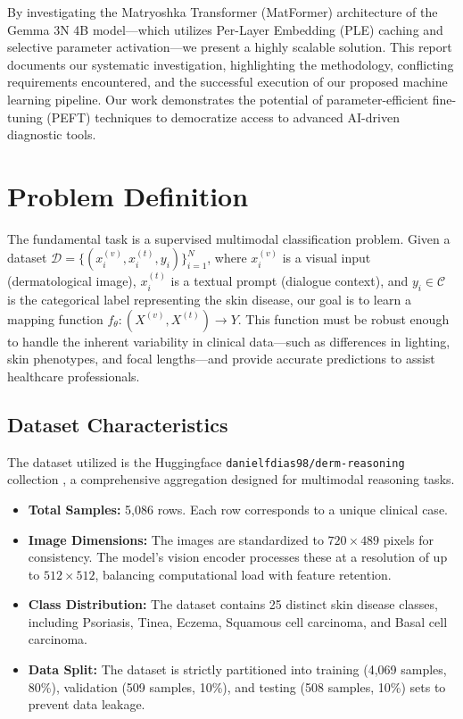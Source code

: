 \documentclass[12pt, a4paper]{article}
\begin{document}
By investigating the Matryoshka Transformer (MatFormer) architecture \cite{kusupati2022matryoshka} of the Gemma 3N 4B model—which utilizes Per-Layer Embedding (PLE) caching and selective parameter activation—we present a highly scalable solution. This report documents our systematic investigation, highlighting the methodology, conflicting requirements encountered, and the successful execution of our proposed machine learning pipeline. Our work demonstrates the potential of parameter-efficient fine-tuning (PEFT) techniques to democratize access to advanced AI-driven diagnostic tools.

\section{Problem Definition}
The fundamental task is a supervised multimodal classification problem. Given a dataset $\mathcal{D} = \{(x_i^{(v)}, x_i^{(t)}, y_i)\}_{i=1}^N$, where $x_i^{(v)}$ is a visual input (dermatological image), $x_i^{(t)}$ is a textual prompt (dialogue context), and $y_i \in \mathcal{C}$ is the categorical label representing the skin disease, our goal is to learn a mapping function $f_\theta: (X^{(v)}, X^{(t)}) \rightarrow Y$. This function must be robust enough to handle the inherent variability in clinical data—such as differences in lighting, skin phenotypes, and focal lengths—and provide accurate predictions to assist healthcare professionals.

\subsection{Dataset Characteristics}
The dataset utilized is the Huggingface \texttt{danielfdias98/derm-reasoning} collection \cite{dias2026derm-reasoning}, a comprehensive aggregation designed for multimodal reasoning tasks.
\begin{itemize}
  \item \textbf{Total Samples:} 5,086 rows. Each row corresponds to a unique clinical case.
  \item \textbf{Image Dimensions:} The images are standardized to $720 \times 489$ pixels for consistency. The model's vision encoder processes these at a resolution of up to $512 \times 512$, balancing computational load with feature retention.
  \item \textbf{Class Distribution:} The dataset contains 25 distinct skin disease classes, including Psoriasis, Tinea, Eczema, Squamous cell carcinoma, and Basal cell carcinoma.
  \item \textbf{Data Split:} The dataset is strictly partitioned into training (4,069 samples, 80\%), validation (509 samples, 10\%), and testing (508 samples, 10\%) sets to prevent data leakage.
\end{itemize}
\end{document}
